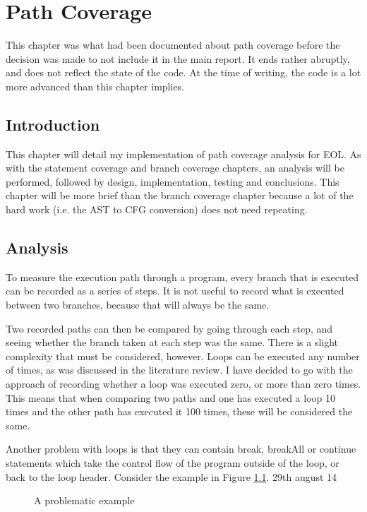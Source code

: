 \chapter{Path Coverage}

This chapter was what had been documented about path coverage before the decision was made to not include it in the main report. It ends rather abruptly, and does not reflect the state of the code. At the time of writing, the code is a lot more advanced than this chapter implies.

\section{Introduction}

This chapter will detail my implementation of path coverage analysis for EOL. As with the statement coverage and branch coverage chapters, an analysis will be performed, followed by design, implementation, testing and conclusions. This chapter will be more brief than the branch coverage chapter because a lot of the hard work (i.e. the AST to CFG conversion) does not need repeating.

\section{Analysis}

To measure the execution path through a program, every branch that is executed can be recorded as a series of steps. It is not useful to record what is executed between two branches, because that will always be the same. 

Two recorded paths can then be compared by going through each step, and seeing whether the branch taken at each step was the same. There is a slight complexity that must be considered, however. Loops can be executed any number of times, as was discussed in the literature review. I have decided to go with the approach of recording whether a loop was executed zero, or more than zero times. This means that when comparing two paths and one has executed a loop 10 times and the other path has executed it 100 times, these will be considered the same.

Another problem with loops is that they can contain break, breakAll or continue statements which take the control flow of the program outside of the loop, or back to the loop header. Consider the example in Figure \ref{fig:pathCoverageProblem}.
29th august 14
\begin{figure}
\centering
\begin{minipage}{.33\textwidth}
  \centering
  
\end{minipage}%
\begin{minipage}{.5\textwidth}
  \centering
\end{minipage}
\caption{A problematic example}
\label{fig:pathCoverageProblem}
\end{figure}

